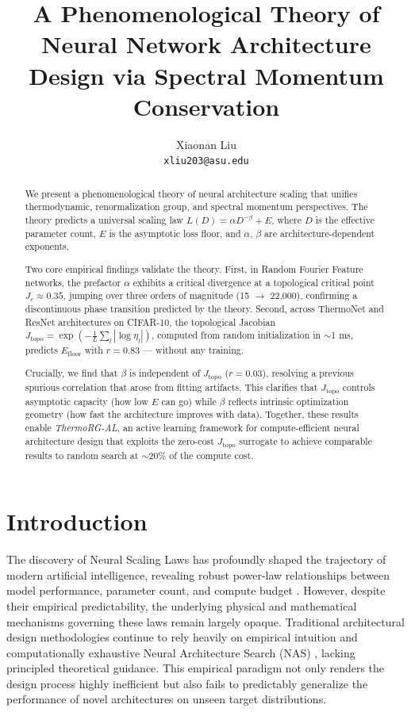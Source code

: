 \documentclass[11pt, a4paper]{article}
\title{A Phenomenological Theory of Neural Network Architecture Design via Spectral Momentum Conservation}
\author{
  Xiaonan Liu \\
  \texttt{xliu203@asu.edu}
}
\date{}
\theoremstyle{definition}
\begin{document}
\maketitle

\begin{abstract}
We present a phenomenological theory of neural architecture scaling that unifies thermodynamic, renormalization group, and spectral momentum perspectives. The theory predicts a universal scaling law $L(D) = \alpha D^{-\beta} + E$, where $D$ is the effective parameter count, $E$ is the asymptotic loss floor, and $\alpha$, $\beta$ are architecture-dependent exponents.

Two core empirical findings validate the theory. First, in Random Fourier Feature networks, the prefactor $\alpha$ exhibits a critical divergence at a topological critical point $J_c \approx 0.35$, jumping over three orders of magnitude (15 $\to$ 22,000), confirming a discontinuous phase transition predicted by the theory. Second, across ThermoNet and ResNet architectures on CIFAR-10, the topological Jacobian $J_\mathrm{topo} = \exp(-\frac{1}{L}\sum_l|\log\eta_l|)$, computed from random initialization in $\sim$1 ms, predicts $E_\mathrm{floor}$ with $r = 0.83$ --- without any training.

Crucially, we find that $\beta$ is independent of $J_\mathrm{topo}$ ($r = 0.03$), resolving a previous spurious correlation that arose from fitting artifacts. This clarifies that $J_\mathrm{topo}$ controls asymptotic capacity (how low $E$ can go) while $\beta$ reflects intrinsic optimization geometry (how fast the architecture improves with data). Together, these results enable \emph{ThermoRG-AL}, an active learning framework for compute-efficient neural architecture design that exploits the zero-cost $J_\mathrm{topo}$ surrogate to achieve comparable results to random search at $\sim$20\% of the compute cost.
\end{abstract}

\section{Introduction}
\label{sec:intro}

The discovery of Neural Scaling Laws has profoundly shaped the trajectory of modern artificial intelligence, revealing robust power-law relationships between model performance, parameter count, and compute budget \cite{kaplan2020scaling, hoffmann2022training}. However, despite their empirical predictability, the underlying physical and mathematical mechanisms governing these laws remain largely opaque. Traditional architectural design methodologies continue to rely heavily on empirical intuition and computationally exhaustive Neural Architecture Search (NAS) \cite{zoph2016neural}, lacking principled theoretical guidance. This empirical paradigm not only renders the design process highly inefficient but also fails to predictably generalize the performance of novel architectures on unseen target distributions.
\end{document}
